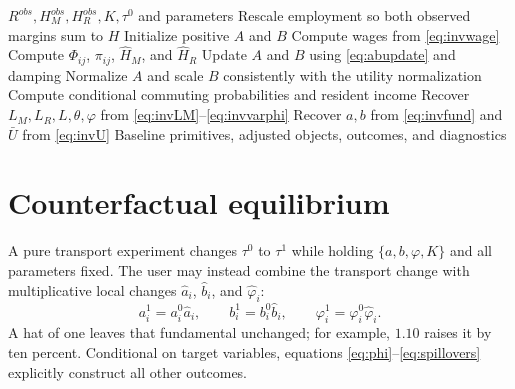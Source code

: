 \documentclass[11pt,a4paper]{article}
\begin{document}
\begin{algorithm}[ht]
\caption{Baseline inversion}
\begin{algorithmic}[1]
\Require $R^{obs},H_M^{obs},H_R^{obs},K,\tau^0$ and parameters
\State Rescale employment so both observed margins sum to $H$
\State Initialize positive $A$ and $B$
 \State Compute wages from \eqref{eq:invwage}
 \State Compute $\Phi_{ij}$, $\pi_{ij}$, $\widehat H_M$, and $\widehat H_R$
 \State Update $A$ and $B$ using \eqref{eq:abupdate} and damping
 \State Normalize $A$ and scale $B$ consistently with the utility normalization
\EndWhile
\State Compute conditional commuting probabilities and resident income
\State Recover $L_M,L_R,L,\theta,\varphi$ from \eqref{eq:invLM}--\eqref{eq:invvarphi}
\State Recover $a,b$ from \eqref{eq:invfund} and $\bar U$ from \eqref{eq:invU}
\Ensure Baseline primitives, adjusted objects, outcomes, and diagnostics
\end{algorithmic}
\end{algorithm}

\section{Counterfactual equilibrium}
A pure transport experiment changes $\tau^0$ to $\tau^1$ while holding
$\{a,b,\varphi,K\}$ and all parameters fixed. The user may instead combine the
transport change with multiplicative local changes
$\widehat a_i$, $\widehat b_i$, and $\widehat\varphi_i$:
\begin{equation}
 a_i^1=a_i^0\widehat a_i,\qquad
 b_i^1=b_i^0\widehat b_i,\qquad
 \varphi_i^1=\varphi_i^0\widehat\varphi_i.             \label{eq:primitivehats}
\end{equation}
A hat of one leaves that fundamental unchanged; for example, $1.10$ raises it
by ten percent. Conditional on target variables, equations
\eqref{eq:phi}--\eqref{eq:spillovers} explicitly construct all other outcomes.
\end{document}
